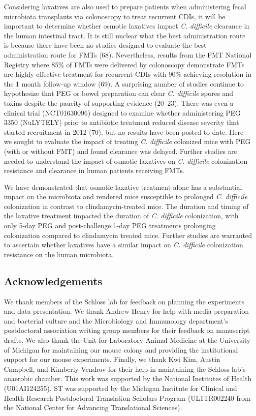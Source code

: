 \documentclass[
  11pt,
]{article}
\begin{document}
Considering laxatives are also used to prepare patients when
administering fecal microbiota transplants via colonoscopy to treat
recurrent CDIs, it will be important to determine whether osmotic
laxatives impact \emph{C. difficile} clearance in the human intestinal
tract. It is still unclear what the best administration route is because
there have been no studies designed to evaluate the best administration
route for FMTs (68). Nevertheless, results from the FMT National
Registry where 85\% of FMTs were delivered by colonoscopy demonstrate
FMTs are highly effective treatment for recurrent CDIs with 90\%
achieving resolution in the 1 month follow-up window (69). A surprising
number of studies continue to hypothesize that PEG or bowel preparation
can clear \emph{C. difficile} spores and toxins despite the paucity of
supporting evidence (20--23). There was even a clinical trial
(NCT01630096) designed to examine whether administering PEG 3350
(NuLYTELY) prior to antibiotic treatment reduced disease severity that
started recruitment in 2012 (70), but no results have been posted to
date. Here we sought to evaluate the impact of treating \emph{C.
difficile} colonized mice with PEG (with or without FMT) and found
clearance was delayed. Further studies are needed to understand the
impact of osmotic laxatives on \emph{C. difficile} colonization
resistance and clearance in human patients receiving FMTs.

We have demonstrated that osmotic laxative treatment alone has a
substantial impact on the microbiota and rendered mice susceptible to
prolonged \emph{C. difficile} colonization in contrast to
clindamycin-treated mice. The duration and timing of the laxative
treatment impacted the duration of \emph{C. difficile} colonization,
with only 5-day PEG and post-challenge 1-day PEG treatments prolonging
colonization compared to clindamycin treated mice. Further studies are
warranted to ascertain whether laxatives have a similar impact on
\emph{C. difficile} colonization resistance on the human microbiota.

\hypertarget{acknowledgements}{%
\subsection{Acknowledgements}\label{acknowledgements}}

We thank members of the Schloss lab for feedback on planning the
experiments and data presentation. We thank Andrew Henry for help with
media preparation and bacterial culture and the Microbiology and
Immunology department's postdoctoral association writing group members
for their feedback on manuscript drafts. We also thank the Unit for
Laboratory Animal Medicine at the University of Michigan for maintaining
our mouse colony and providing the institutional support for our mouse
experiments. Finally, we thank Kwi Kim, Austin Campbell, and Kimberly
Vendrov for their help in maintaining the Schloss lab's anaerobic
chamber. This work was supported by the National Institutes of Health
(U01AI124255). ST was supported by the Michigan Institute for Clinical
and Health Research Postdoctoral Translation Scholars Program
(UL1TR002240 from the National Center for Advancing Translational
Sciences).
\end{document}
